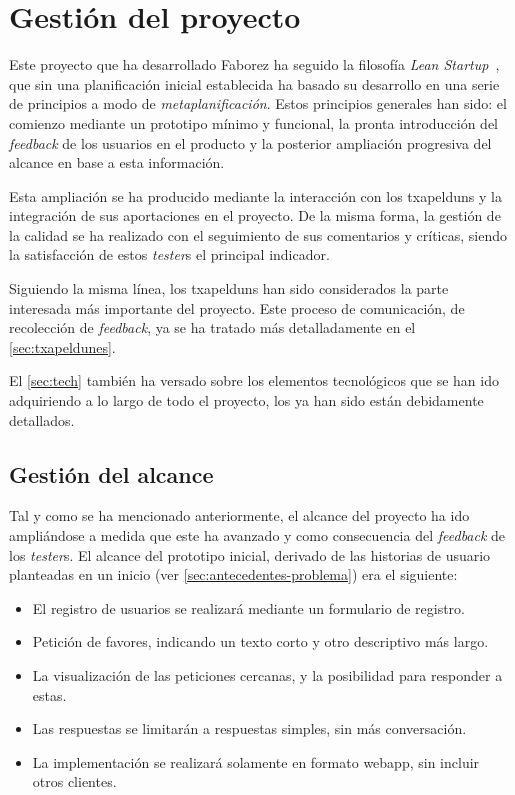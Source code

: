 \documentclass[main]{subfiles}
\begin{document}
\chapter{Gestión del proyecto}

Este proyecto que ha desarrollado Faborez ha seguido la filosofía \emph{Lean Startup}~\autocite{leanstartup}, que sin una planificación inicial establecida ha basado su desarrollo en una serie de principios a modo de \emph{metaplanificación}. Estos principios generales han sido: el comienzo mediante un prototipo mínimo y funcional, la pronta introducción del \emph{feedback} de los usuarios en el producto y la posterior ampliación progresiva del alcance en base a esta información.

Esta ampliación se ha producido mediante la interacción con los \glspl{txapeldun} y la integración de sus aportaciones en el proyecto. De la misma forma, la gestión de la calidad se ha realizado con el seguimiento de sus comentarios y críticas, siendo la satisfacción de estos \emph{tester}s el principal indicador.

Siguiendo la misma línea, los \glspl{txapeldun} han sido considerados la parte interesada más importante del proyecto. Este proceso de comunicación, de recolección de \emph{feedback}, ya se ha tratado más detalladamente en el \cref{sec:txapeldunes}.

El \cref{sec:tech} también ha versado sobre los elementos tecnológicos que se han ido adquiriendo a lo largo de todo el proyecto, los ya han sido están debidamente detallados.

\section{Gestión del alcance}

Tal y como se ha mencionado anteriormente, el alcance del proyecto ha ido ampliándose a medida que este ha avanzado y como consecuencia del \emph{feedback} de los \emph{tester}s. El alcance del prototipo inicial, derivado de las historias de usuario planteadas en un inicio (ver \cref{sec:antecedentes-problema}) era el siguiente:

\begin{itemize}
  \item El registro de usuarios se realizará mediante un formulario de registro.
  \item Petición de favores, indicando un texto corto y otro descriptivo más largo.
  \item La visualización de las peticiones cercanas, y la posibilidad para responder a estas.
  \item Las respuestas se limitarán a respuestas simples, sin más conversación.
  \item La implementación se realizará solamente en formato \gls{webapp}, sin incluir otros clientes.
\end{itemize}
\end{document}
